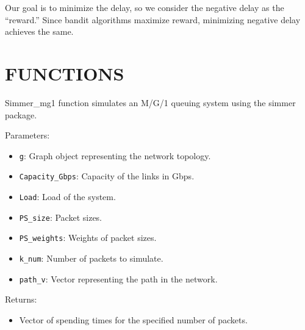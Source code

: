 \documentclass[
]{article}
\author{}
\date{\vspace{-2.5em}}
\providecommand{\tightlist}{%
  \setlength{\itemsep}{0pt}\setlength{\parskip}{0pt}}
\begin{document}
Our goal is to minimize the delay, so we consider the negative delay as
the ``reward.'' Since bandit algorithms maximize reward, minimizing
negative delay achieves the same.

\hypertarget{functions}{%
\section{FUNCTIONS}\label{functions}}

Simmer\_mg1 function simulates an M/G/1 queuing system using the simmer
package.

Parameters:

\begin{itemize}
\item
  \texttt{g}: Graph object representing the network topology.
\item
  \texttt{Capacity\_Gbps}: Capacity of the links in Gbps.
\item
  \texttt{Load}: Load of the system.
\item
  \texttt{PS\_size}: Packet sizes.
\item
  \texttt{PS\_weights}: Weights of packet sizes.
\item
  \texttt{k\_num}: Number of packets to simulate.
\item
  \texttt{path\_v}: Vector representing the path in the network.
\end{itemize}

Returns:

\begin{itemize}
\tightlist
\item
  Vector of spending times for the specified number of packets.
\end{itemize}
\end{document}
